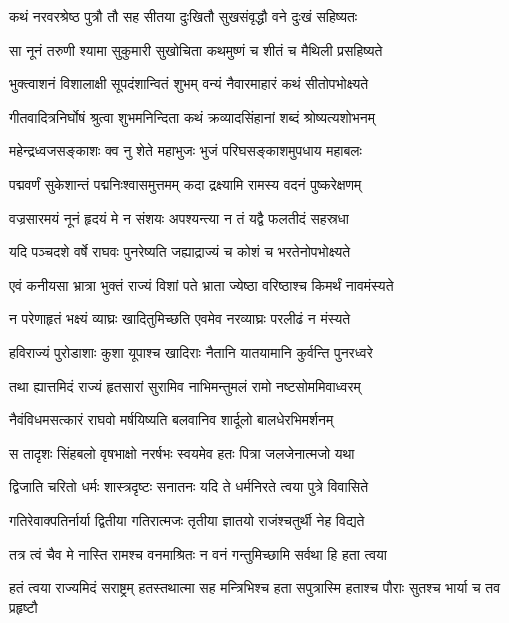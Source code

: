 \twolineshloka
{कथं नरवरश्रेष्ठ पुत्रौ तौ सह सीतया}
{दुःखितौ सुखसंवृद्धौ वने दुःखं सहिष्यतः} %

\twolineshloka
{सा नूनं तरुणी श्यामा सुकुमारी सुखोचिता}
{कथमुष्णं च शीतं च मैथिली प्रसहिष्यते} %

\twolineshloka
{भुक्त्वाशनं विशालाक्षी सूपदंशान्वितं शुभम्}
{वन्यं नैवारमाहारं कथं सीतोपभोक्ष्यते} %

\twolineshloka
{गीतवादित्रनिर्घोषं श्रुत्वा शुभमनिन्दिता}
{कथं क्रव्यादसिंहानां शब्दं श्रोष्यत्यशोभनम्} %

\twolineshloka
{महेन्द्रध्वजसङ्काशः क्व नु शेते महाभुजः}
{भुजं परिघसङ्काशमुपधाय महाबलः} %

\twolineshloka
{पद्मवर्णं सुकेशान्तं पद्मनिःश्वासमुत्तमम्}
{कदा द्रक्ष्यामि रामस्य वदनं पुष्करेक्षणम्} %

\twolineshloka
{वज्रसारमयं नूनं हृदयं मे न संशयः}
{अपश्यन्त्या न तं यद्वै फलतीदं सहस्रधा} %

\twolineshloka
{यदि पञ्चदशे वर्षे राघवः पुनरेष्यति}
{जह्याद्राज्यं च कोशं च भरतेनोपभोक्ष्यते} %

\twolineshloka
{एवं कनीयसा भ्रात्रा भुक्तं राज्यं विशां पते}
{भ्राता ज्येष्ठा वरिष्ठाश्च किमर्थं नावमंस्यते} %

\twolineshloka
{न परेणाहृतं भक्ष्यं व्याघ्रः खादितुमिच्छति}
{एवमेव नरव्याघ्रः परलीढं न मंस्यते} %

\twolineshloka
{हविराज्यं पुरोडाशाः कुशा यूपाश्च खादिराः}
{नैतानि यातयामानि कुर्वन्ति पुनरध्वरे} %

\twolineshloka
{तथा ह्यात्तमिदं राज्यं हृतसारां सुरामिव}
{नाभिमन्तुमलं रामो नष्टसोममिवाध्वरम्} %

\twolineshloka
{नैवंविधमसत्कारं राघवो मर्षयिष्यति}
{बलवानिव शार्दूलो बालधेरभिमर्शनम्} %

\twolineshloka
{स तादृशः सिंहबलो वृषभाक्षो नरर्षभः}
{स्वयमेव हतः पित्रा जलजेनात्मजो यथा} %

\twolineshloka
{द्विजाति चरितो धर्मः शास्त्रदृष्टः सनातनः}
{यदि ते धर्मनिरते त्वया पुत्रे विवासिते} %

\twolineshloka
{गतिरेवाक्पतिर्नार्या द्वितीया गतिरात्मजः}
{तृतीया ज्ञातयो राजंश्चतुर्थी नेह विद्यते} %

\twolineshloka
{तत्र त्वं चैव मे नास्ति रामश्च वनमाश्रितः}
{न वनं गन्तुमिच्छामि सर्वथा हि हता त्वया} %

\fourlineindentedshloka
{हतं त्वया राज्यमिदं सराष्ट्रम्}
{हतस्तथात्मा सह मन्त्रिभिश्च}
{हता सपुत्रास्मि हताश्च पौराः}
{सुतश्च भार्या च तव प्रहृष्टौ} %

